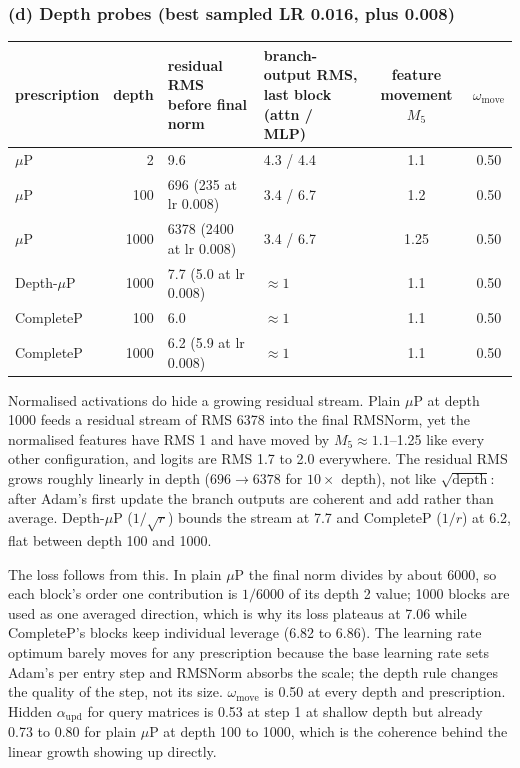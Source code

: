 \documentclass[10pt,letterpaper]{article}
\newcommand{\muP}{$\mu$P}
\begin{document}
\subsubsection*{(d) Depth probes (best sampled LR 0.016, plus 0.008)}

\begin{table}[H]\footnotesize
\begin{tabularx}{\textwidth}{l r L L c c}\toprule
prescription & depth & residual RMS before final norm & branch-output RMS, last block (attn / MLP) & feature movement $M_5$ & $\omega_{\mathrm{move}}$\\\midrule
\muP & 2 & 9.6 & 4.3 / 4.4 & 1.1 & 0.50\\
\muP & 100 & 696 (235 at lr 0.008) & 3.4 / 6.7 & 1.2 & 0.50\\
\muP & 1000 & 6378 (2400 at lr 0.008) & 3.4 / 6.7 & 1.25 & 0.50\\
Depth-\muP & 1000 & 7.7 (5.0 at lr 0.008) & $\approx1$ & 1.1 & 0.50\\
CompleteP & 100 & 6.0 & $\approx1$ & 1.1 & 0.50\\
CompleteP & 1000 & 6.2 (5.9 at lr 0.008) & $\approx1$ & 1.1 & 0.50\\\bottomrule
\end{tabularx}
\end{table}

Normalised activations do hide a growing residual stream. Plain \muP{} at depth 1000 feeds a residual stream of RMS 6378 into the final RMSNorm, yet the normalised features have RMS 1 and have moved by $M_5\approx1.1$--1.25 like every other configuration, and logits are RMS 1.7 to 2.0 everywhere. The residual RMS grows roughly linearly in depth ($696\to6378$ for $10\times$ depth), not like $\sqrt{\text{depth}}$: after Adam's first update the branch outputs are coherent and add rather than average. Depth-\muP{} ($1/\sqrt r$) bounds the stream at 7.7 and CompleteP ($1/r$) at 6.2, flat between depth 100 and 1000.

The loss follows from this. In plain \muP{} the final norm divides by about 6000, so each block's order one contribution is $1/6000$ of its depth 2 value; 1000 blocks are used as one averaged direction, which is why its loss plateaus at 7.06 while CompleteP's blocks keep individual leverage (6.82 to 6.86). The learning rate optimum barely moves for any prescription because the base learning rate sets Adam's per entry step and RMSNorm absorbs the scale; the depth rule changes the quality of the step, not its size. $\omega_{\mathrm{move}}$ is 0.50 at every depth and prescription. Hidden $\alpha_{\mathrm{upd}}$ for query matrices is 0.53 at step 1 at shallow depth but already 0.73 to 0.80 for plain \muP{} at depth 100 to 1000, which is the coherence behind the linear growth showing up directly.
\end{document}
